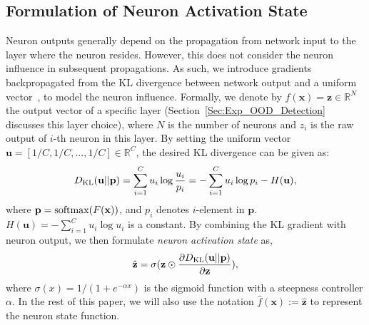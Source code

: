 \documentclass{article} \usepackage{iclr2024_conference,times}
\begin{document}
\subsection{Formulation of Neuron Activation State} 
\vspace{-1mm}
\label{Sec:Method_NState}
Neuron outputs generally depend on the propagation from network input to the layer where the neuron resides. However, this does not consider the neuron influence in subsequent propagations.
{As such, we introduce gradients backpropagated from the KL divergence between network output and a uniform vector~\citep{OOD_Detect:GradNorm}, to model the neuron influence. }
Formally, we denote by $f(\mathbf{x}) = \mathbf{z} \in \mathbb{R}^{N}$ the output vector of a specific layer (Section~\ref{Sec:Exp_OOD_Detection} discusses this layer choice), where $N$ is the number of neurons and $z_i$ is the raw output of $i$-th neuron in this layer.
By setting the uniform vector $\mathbf{u} = [1/C, 1/C, ..., 1/C]\in \mathbb{R}^C$, the desired KL divergence can be given as:
\vspace{-2mm}
\begin{equation}
	D_{\rm KL}({\mathbf{u}}||\mathbf{p})  = \sum_{i=1}^{C}u_i \log{\frac{u_i}{p_i}} = - \sum_{i=1}^{C}u_i \log{p_i}-H(\mathbf{u}),
\vspace{-2mm}
\end{equation}
where $\mathbf{p} = {\rm softmax}(F(\mathbf{x}))$, and ${p}_i$ denotes $i$-element in $\mathbf{p}$. $H(\mathbf{u})= -\sum_{i=1}^{C}u_i \log{u_i}$ is a constant. 
By combining the KL gradient with neuron output, we then formulate \textit{neuron activation state} as, 
\vspace{-0.5mm}
\begin{equation}
	\hat{\mathbf{z}} = \sigma(\mathbf{z} \odot \frac{\partial{D_{\rm KL}({\mathbf{u}}||\mathbf{p})}}{\partial \mathbf{z}}) ,
	\label{Eq:State}
\end{equation}
where $\sigma(x) = 1/(1+e^{-\alpha x})$ is the sigmoid function with a steepness controller $\alpha$. 
In the rest of this paper, we will also use the notation $\hat{f}(\mathbf{x}) := \hat{\mathbf{z}}$ to represent the neuron state function.
\end{document}
